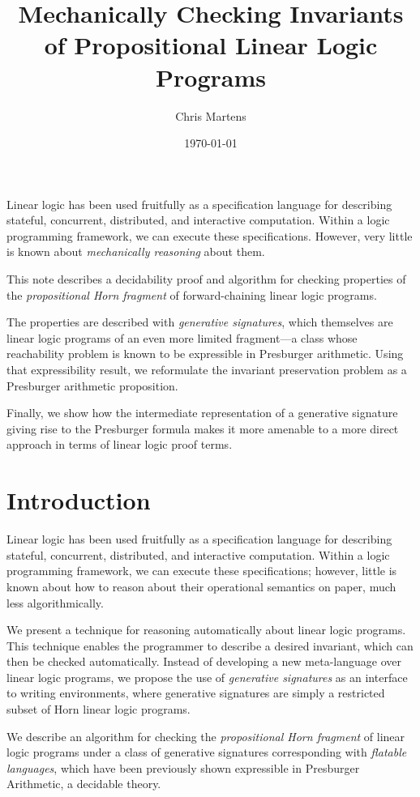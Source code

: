 \documentclass[fullpage, 11pt]{article}
\title{Mechanically Checking Invariants of Propositional Linear Logic Programs}
\author{Chris Martens}
\date{\today}
\begin{document}
\maketitle

\abstract

Linear logic has been used fruitfully as a specification language for
describing stateful, concurrent, distributed, and interactive computation.
Within a logic programming framework, we can execute these specifications.
However, very little is known about {\em mechanically reasoning} about
them.

This note describes a decidability proof and algorithm for checking
properties of the {\em propositional Horn fragment} of forward-chaining
linear logic programs.

The properties are described with {\em generative signatures}, which
themselves are linear logic programs of an even more limited
fragment---a class whose reachability problem is known to be expressible in
Presburger arithmetic. Using that expressibility result, we reformulate
the invariant preservation problem as a Presburger arithmetic proposition.

Finally, we show how the intermediate representation of a generative
signature giving rise to the Presburger formula makes it more amenable to a
more direct approach in terms of linear logic proof terms.

\section{Introduction}

Linear logic has been used fruitfully as a specification language for
describing stateful, concurrent, distributed, and interactive computation.
Within a logic programming framework, we can execute these specifications;
however, little is known about how to reason about their operational
semantics on paper, much less algorithmically.

We present a technique for reasoning automatically about linear logic
programs. This technique enables the programmer to describe a desired 
invariant, which can then be checked
automatically. Instead of developing a new meta-language over linear logic
programs, we propose the use of {\em generative signatures} as an interface
to writing environments, where generative signatures are simply a restricted
subset of Horn linear logic programs.

We describe an algorithm for checking the {\em propositional Horn fragment}
of linear logic programs under a class of generative signatures
corresponding with {\em flatable languages}, which have been previously
shown expressible in Presburger Arithmetic, a decidable theory.
\end{document}
